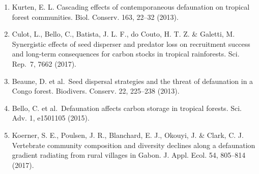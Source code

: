 \documentclass[
  12pt,
]{article}
\begin{document}
\begin{enumerate}
\def\labelenumi{\arabic{enumi}.}
\item
  Kurten, E. L. Cascading effects of contemporaneous defaunation on
  tropical forest communities. Biol. Conserv. 163, 22--32 (2013).
\item
  Culot, L., Bello, C., Batista, J. L. F., do Couto, H. T. Z. \&
  Galetti, M. Synergistic effects of seed disperser and predator loss on
  recruitment success and long-term consequences for carbon stocks in
  tropical rainforests. Sci. Rep.~7, 7662 (2017).
\item
  Beaune, D. et al.~Seed dispersal strategies and the threat of
  defaunation in a Congo forest. Biodivers. Conserv. 22, 225--238
  (2013).
\item
  Bello, C. et al.~Defaunation affects carbon storage in tropical
  forests. Sci. Adv. 1, e1501105 (2015).
\item
  Koerner, S. E., Poulsen, J. R., Blanchard, E. J., Okouyi, J. \& Clark,
  C. J. Vertebrate community composition and diversity declines along a
  defaunation gradient radiating from rural villages in Gabon. J. Appl.
  Ecol. 54, 805--814 (2017).
\end{enumerate}
\end{document}
